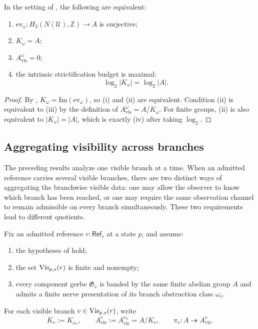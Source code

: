 \begin{corollary}\label{cor:maximal-collapse}
In the setting of , the following are equivalent:
\begin{enumerate}[label=(\roman*),nosep]
\item $\mathrm{ev}_{\omega}:H_2(N(\mathcal U),\mathbb Z)\to A$ is surjective;
\item $K_{\omega}=A$;
\item $A_{\mathrm{vis}}^{\omega}=0$;
\item the intrinsic strictification budget is maximal:
\[
\log_2|K_{\omega}|=\log_2|A|.
\]
\end{enumerate}
\end{corollary}

\begin{proof}
By , $K_{\omega}=\mathrm{Im}(\mathrm{ev}_{\omega})$, so \textup{(i)} and \textup{(ii)} are equivalent. Condition \textup{(ii)} is equivalent to \textup{(iii)} by the definition of $A_{\mathrm{vis}}^{\omega}=A/K_{\omega}$. For finite groups, \textup{(ii)} is also equivalent to $|K_{\omega}|=|A|$, which is exactly \textup{(iv)} after taking $\log_2$.
\end{proof}

\subsection{Aggregating visibility across branches}

The preceding results analyze one visible branch at a time. When an admitted reference carries several visible branches, there are two distinct ways of aggregating the branchwise visible data: one may allow the observer to know which branch has been reached, or one may require the same observation channel to remain admissible on every branch simultaneously. These two requirements lead to different quotients.

\begin{definition}\label{def:branchwise-intrinsic-data}
Fix an admitted reference $r:\mathsf{Ref}_s$ at a state $p$, and assume:
\begin{enumerate}[label=(\roman*),nosep]
\item the hypotheses of  hold;
\item the set $\mathrm{Vis}_{p,s}(r)$ is finite and nonempty;
\item every component gerbe $\mathfrak G_v$ is banded by the same finite abelian group $A$ and admits a finite nerve presentation of its branch obstruction class $\omega_v$.
\end{enumerate}
For each visible branch $v\in \mathrm{Vis}_{p,s}(r)$, write
\[
K_v:=K_{\omega_v},
\qquad
A_{\mathrm{vis}}^v:=A_{\mathrm{vis}}^{\omega_v}=A/K_v,
\qquad
\pi_v:A\twoheadrightarrow A_{\mathrm{vis}}^v.
\]
\end{definition}

